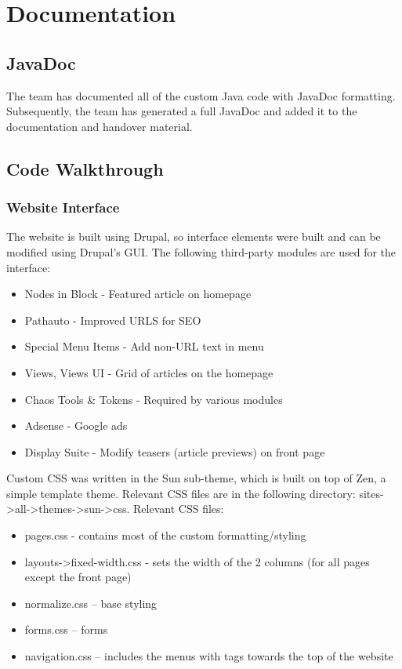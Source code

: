 \documentclass[10pt]{article} %
\begin{document}
\section{Documentation}

\subsection{JavaDoc}

The team has documented all of the custom Java code with JavaDoc formatting. Subsequently, the team has generated a full JavaDoc and added it to the documentation and handover material.

\subsection{Code Walkthrough}

\subsubsection{Website Interface}

The website is built using Drupal, so interface elements were built and can be modified using Drupal’s GUI. The following third-party modules are used for the interface:

\begin{itemize}
\item Nodes in Block - Featured article on homepage
\item Pathauto - Improved URLS for SEO
\item Special Menu Items - Add non-URL text in menu
\item Views, Views UI - Grid of articles on the homepage
\item Chaos Tools \& Tokens - Required by various modules
\item Adsense - Google ads
\item Display Suite - Modify teasers (article previews) on front page
\end{itemize}

Custom CSS was written in the Sun sub-theme, which is built on top of Zen, a simple template theme. Relevant CSS files are in the following directory: sites-\textgreater all-\textgreater themes-\textgreater sun-\textgreater css.
Relevant CSS files:

\begin{itemize}
\item pages.css - contains most of the custom formatting/styling
\item layouts-\textgreater fixed-width.css - sets the width of the 2 columns (for all pages except the front page)
\item normalize.css – base styling
\item forms.css – forms
\item navigation.css – includes the menus with tags towards the top of the website
\end{itemize}
\end{document}
